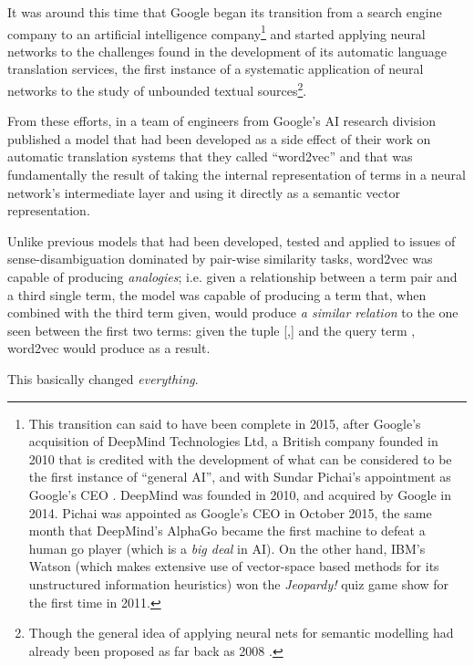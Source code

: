 It was around this time that Google began its transition from a search engine company to an artificial intelligence company\footnote{
    This transition can said to have been complete in 2015, after Google's acquisition of DeepMind Technologies Ltd, a British company founded in 2010 that is credited with the development of what can be considered to be the first instance of ``general AI'', and with Sundar Pichai's appointment as Google's CEO \citep{hacket2016,mccracken2016}.
    DeepMind was founded in 2010, and acquired by Google in 2014.
    Pichai was appointed as Google's CEO in October 2015, the same month that DeepMind's AlphaGo became the first machine to defeat a human go player (which is a \emph{big deal} in AI).
    On the other hand, IBM's Watson (which makes extensive use of vector-space based methods for its unstructured information heuristics) won the \emph{Jeopardy!} quiz game show for the first time in 2011.
} and started applying neural networks to the challenges found in the development of its automatic language translation services, the first instance of a systematic application of neural networks to the study of unbounded textual sources\footnote{
    Though the general idea of applying neural nets for semantic modelling had already been proposed as far back as 2008 \citep{collobert2008}.
}.

From these efforts, in \citeyear{mikolov2013} a team of engineers from Google's AI research division published a model that had been developed as a side effect of their work on automatic translation systems that they called ``word2vec'' \citep{mikolov2013,mikolov2013a} and that was fundamentally the result of taking the internal representation of terms in a neural network's intermediate layer and using it directly as a semantic vector representation.

Unlike previous models that had been developed, tested and applied to issues of sense-disambiguation dominated by pair-wise similarity tasks, word2vec was capable of producing \emph{analogies}; i.e. given a relationship between a term pair and a third single term, the model was capable of producing a term that, when combined with the third term given, would produce \emph{a similar relation} to the one seen between the first two terms: given the tuple [,] and the query term , word2vec would produce  as a result.

This basically changed \emph{everything}.

